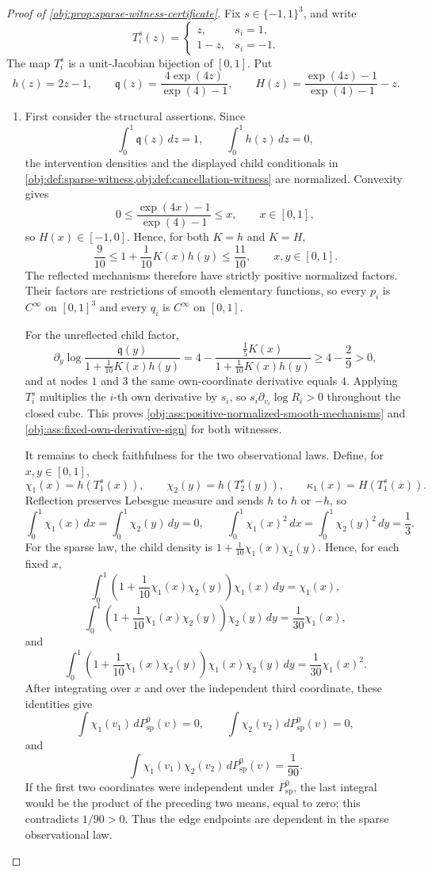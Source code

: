 \documentclass[11pt]{article}
\begin{document}
\begin{proof}[Proof of \cref{obj:prop:sparse-witness-certificate}]
Fix \(s\in\{-1,1\}^3\), and write
\[
T_i^s(z)=
\begin{cases}
z,& s_i=1,\\
1-z,& s_i=-1.
\end{cases}
\]
The map \(T_i^s\) is a unit-Jacobian bijection of \([0,1]\).  Put
\[
h(z)=2z-1,\qquad
\mathfrak q(z)=\frac{4\exp(4z)}{\exp(4)-1},
\qquad
H(z)=\frac{\exp(4z)-1}{\exp(4)-1}-z .
\]

\begin{enumerate}
\item First consider the structural assertions.  Since
\[
\int_0^1 \mathfrak q(z)\,dz=1,\qquad \int_0^1 h(z)\,dz=0,
\]
the intervention densities and the displayed child conditionals in \cref{obj:def:sparse-witness,obj:def:cancellation-witness} are normalized.  Convexity gives
\[
0\le \frac{\exp(4x)-1}{\exp(4)-1}\le x,\qquad x\in[0,1],
\]
so \(H(x)\in[-1,0]\).  Hence, for both \(K=h\) and \(K=H\),
\[
\frac9{10}\le 1+\frac1{10}K(x)h(y)\le \frac{11}{10},
\qquad x,y\in[0,1].
\]
The reflected mechanisms therefore have strictly positive normalized factors.  Their factors are restrictions of smooth elementary functions, so every \(p_i\) is \(C^\infty\) on \([0,1]^3\) and every \(q_i\) is \(C^\infty\) on \([0,1]\).

For the unreflected child factor,
\[
\partial_y\log\frac{\mathfrak q(y)}{1+\frac1{10}K(x)h(y)}
=
4-\frac{\frac15 K(x)}{1+\frac1{10}K(x)h(y)}
\ge 4-\frac29>0,
\]
and at nodes \(1\) and \(3\) the same own-coordinate derivative equals \(4\).  Applying \(T_i^s\) multiplies the \(i\)-th own derivative by \(s_i\), so \(s_i\partial_{v_i}\log R_i>0\) throughout the closed cube.  This proves \cref{obj:ass:positive-normalized-smooth-mechanisms} and \cref{obj:ass:fixed-own-derivative-sign} for both witnesses.

It remains to check faithfulness for the two observational laws.  Define, for \(x,y\in[0,1]\),
\[
\chi_1(x)=h(T_1^s(x)),\qquad
\chi_2(y)=h(T_2^s(y)),\qquad
\kappa_1(x)=H(T_1^s(x)).
\]
Reflection preserves Lebesgue measure and sends \(h\) to \(h\) or \(-h\), so
\[
\int_0^1\chi_1(x)\,dx=\int_0^1\chi_2(y)\,dy=0,
\qquad
\int_0^1\chi_1(x)^2\,dx=\int_0^1\chi_2(y)^2\,dy=\frac13.
\]
For the sparse law, the child density is \(1+\frac1{10}\chi_1(x)\chi_2(y)\).  Hence, for each fixed \(x\),
\[
\int_0^1\left(1+\frac1{10}\chi_1(x)\chi_2(y)\right)\chi_1(x)\,dy
=
\chi_1(x),
\]
\[
\int_0^1\left(1+\frac1{10}\chi_1(x)\chi_2(y)\right)\chi_2(y)\,dy
=
\frac1{30}\chi_1(x),
\]
and
\[
\int_0^1\left(1+\frac1{10}\chi_1(x)\chi_2(y)\right)\chi_1(x)\chi_2(y)\,dy
=
\frac1{30}\chi_1(x)^2.
\]
After integrating over \(x\) and over the independent third coordinate, these identities give
\[
\int \chi_1(v_1)\,dP^0_{\mathrm{sp}}(v)=0,
\qquad
\int \chi_2(v_2)\,dP^0_{\mathrm{sp}}(v)=0,
\]
and
\[
\int \chi_1(v_1)\chi_2(v_2)\,dP^0_{\mathrm{sp}}(v)=\frac1{90}.
\]
If the first two coordinates were independent under \(P^0_{\mathrm{sp}}\), the last integral would be the product of the preceding two means, equal to zero; this contradicts \(1/90>0\).  Thus the edge endpoints are dependent in the sparse observational law.


\end{enumerate}
\end{proof}
\end{document}
